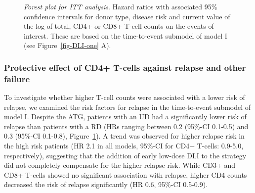 \documentclass[
  letterpaper,
  DIV=11,
  numbers=noendperiod]{scrreprt}
\begin{document}
\begin{figure}


\caption{\label{fig-DLI-five}\emph{Forest plot for ITT analysis}. Hazard
ratios with associated 95\% confidence intervals for donor type, disease
risk and current value of the log of total, CD4+ or CD8+ T-cell counts
on the events of interest. These are based on the time-to-event submodel
of model I (see Figure~\ref{fig-DLI-one} A).}

\end{figure}%

\subsubsection{Protective effect of CD4+ T-cells against relapse and
other
failure}\label{protective-effect-of-cd4-t-cells-against-relapse-and-other-failure}

To investigate whether higher T-cell counts were associated with a lower
risk of relapse, we examined the risk factors for relapse in the
time-to-event submodel of model I. Despite the ATG, patients with an UD
had a significantly lower risk of relapse than patients with a RD (HRs
ranging between 0.2 (95\%-CI 0.1-0.5) and 0.3 (95\%-CI 0.1-0.8),
Figure~\ref{fig-DLI-five}). A trend was observed for higher relapse risk
in the high risk patients (HR 2.1 in all models, 95\%-CI for CD4+
T-cells: 0.9-5.0, respectively), suggesting that the addition of early
low-dose DLI to the strategy did not completely compensate for the
higher relapse risk. While CD3+ and CD8+ T-cells showed no significant
association with relapse, higher CD4 counts decreased the risk of
relapse significantly (HR 0.6, 95\%-CI 0.5-0.9).
\end{document}
